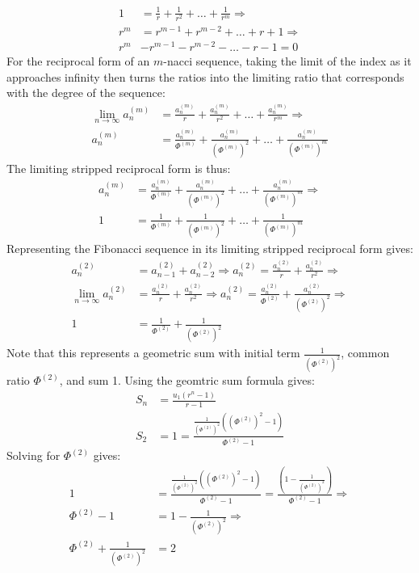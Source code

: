 \documentclass[11pt]{article}
\begin{document}
\begin{align*}
    1&=\frac{1}{r}+\frac{1}{r^2}+\dots+\frac{1}{r^m} \Rightarrow \\
    r^m&=r^{m-1}+r^{m-2}+\dots+r+1 \Rightarrow \\
    r^m&-r^{m-1}-r^{m-2}-\dots-r-1=0
\end{align*}
For the reciprocal form of an \(m\)-nacci sequence, taking the limit of the index as it approaches infinity then turns the ratios into the limiting ratio that corresponds with the degree of the sequence:
\begin{align*}
    \lim_{n\to\infty} a_n^{(m)}&=\frac{a_n^{(m)}}{r}+\frac{a_n^{(m)}}{r^2}+\dots+\frac{a_n^{(m)}}{r^m} \Rightarrow \\
    a_n^{(m)}&=\frac{a_n^{(m)}}{\Phi^{(m)}}+\frac{a_n^{(m)}}{(\Phi^{(m)})^2}+\dots+\frac{a_n^{(m)}}{(\Phi^{(m)})^m}
\end{align*}
The limiting stripped reciprocal form is thus:
\begin{align*}
    a_n^{(m)}&=\frac{a_n^{(m)}}{\Phi^{(m)}}+\frac{a_n^{(m)}}{(\Phi^{(m)})^2}+\dots+\frac{a_n^{(m)}}{(\Phi^{(m)})^m} \Rightarrow \\
    1&=\frac{1}{\Phi^{(m)}}+\frac{1}{(\Phi^{(m)})^2}+\dots+\frac{1}{(\Phi^{(m)})^m}
\end{align*}
Representing the Fibonacci sequence in its limiting stripped reciprocal form gives:
\begin{align*}
    a^{(2)}_n&=a^{(2)}_{n-1}+a^{(2)}_{n-2} \Rightarrow a^{(2)}_n=\frac{a^{(2)}_{n}}{r}+\frac{a^{(2)}_{n}}{r^2} \Rightarrow \\
    \lim_{n\to\infty} a^{(2)}_n&= \frac{a^{(2)}_{n}}{r}+\frac{a^{(2)}_{n}}{r^2} \Rightarrow a^{(2)}_n= \frac{a^{(2)}_{n}}{\Phi^{(2)}}+\frac{a^{(2)}_{n}}{(\Phi^{(2)})^2} \Rightarrow \\
    1&=\frac{1}{\Phi^{(2)}}+\frac{1}{(\Phi^{(2)})^2}
\end{align*}
Note that this represents a geometric sum with initial term \(\frac{1}{(\Phi^{(2)})^2}\), common ratio \(\Phi^{(2)}\), and sum 1. Using the geomtric sum formula gives:
\begin{align*}
    S_n&=\frac{u_1(r^n-1)}{r-1} \\
    S_2&=1=\frac{\frac{1}{(\Phi^{(2)})^2}((\Phi^{(2)})^2-1)}{\Phi^{(2)}-1}
\end{align*}
Solving for \(\Phi^{(2)}\) gives:
\begin{align*}
    1&=\frac{\frac{1}{(\Phi^{(2)})^2}((\Phi^{(2)})^2-1)}{\Phi^{(2)}-1}=\frac{(1-\frac{1}{(\Phi^{(2)})^2})}{\Phi^{(2)}-1} \Rightarrow \\
    \Phi^{(2)}-1&=1-\frac{1}{(\Phi^{(2)})^2} \Rightarrow \\
    \Phi^{(2)}+\frac{1}{(\Phi^{(2)})^2}&=2
\end{align*}
\end{document}

